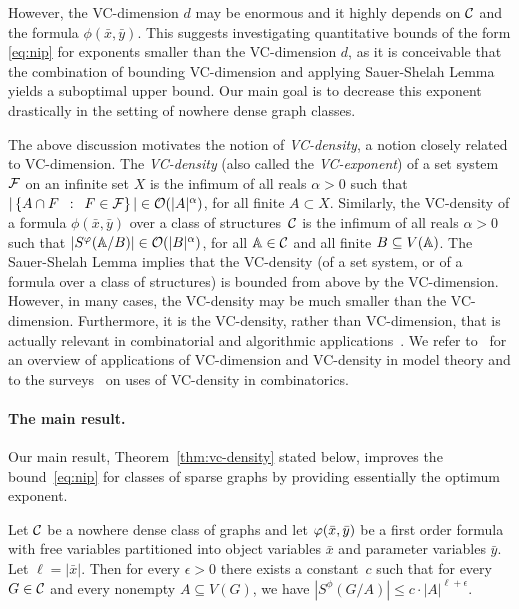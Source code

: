 However, the VC-dimension $d$ may be enormous and it highly depends on $\cal C$ and the formula $\phi(\bar x,\bar y)$.
This suggests investigating quantitative bounds of the form \eqref{eq:nip} for exponents smaller than the VC-dimension $d$, as it is conceivable that the combination of bounding VC-dimension and applying
Sauer-Shelah Lemma yields a suboptimal upper bound. Our main goal is to decrease this exponent drastically in the setting of nowhere dense graph classes.

The above discussion motivates the notion of \emph{VC-density}, a notion closely related to VC-dimension.
The \emph{VC-density} (also called the 
\emph{VC-exponent})
of a set system $\cal F$
on an infinite set $X$ is the infimum of all reals $\alpha>0$ such that 
$|\setof{A\cap F}{F\in \cal F}|\in \Oof(|A|^\alpha)$, for all finite $A\subset X$. 
Similarly, the VC-density of a formula $\phi(\bar x,\bar y)$ over a class of structures~$\cal C$
is the infimum of all reals $\alpha>0$
such that $|S^\phi(\str A/B)|\in \Oof(|B|^\alpha)$,
for all $\str A\in \cal C$ and all finite $B\subset V(\str A)$.
The Sauer-Shelah Lemma
implies that the VC-density (of a set system, or of a formula over a class of structures) is bounded from above by the VC-dimension. 
However, in many cases, the VC-density may be much smaller than the VC-dimension. Furthermore, it is the VC-density, rather than VC-dimension, that is actually relevant in combinatorial
and algorithmic applications~\cite{Bronnimann1995,matouvsek1998geometric,Matousek:2004:BVI:1005787.1005789}.%
We refer to~\cite{aschenbrenner2016vapnik} for an overview of 
applications of VC-dimension and VC-density in model
theory and to the surveys~\cite{furedi1991traces,matouvsek1998geometric} 
on uses of VC-density in
combinatorics. 

\paragraph{The main result.}
Our main result, Theorem~\ref{thm:vc-density} stated below, improves the bound~\eqref{eq:nip} for classes of sparse graphs
by providing essentially the optimum exponent.

 \begin{theorem}\label{thm:vc-density}
Let $\CCC$ be a nowhere dense class of graphs and let $\phi(\tup x,\tup y)$ be a first order formula
with free variables  partitioned  into object variables $\bar x$  and parameter variables $\bar y$. Let $\ell=|\bar x|$. Then 
for every $\epsilon>0$ 
there exists a constant~$c$ such that for every $G\in \CCC$ and every nonempty
$A\subseteq V(G)$, we have $|S^\phi(G/A)|\leq c\cdot |A|^{\ell+\epsilon}.$
 \end{theorem}

